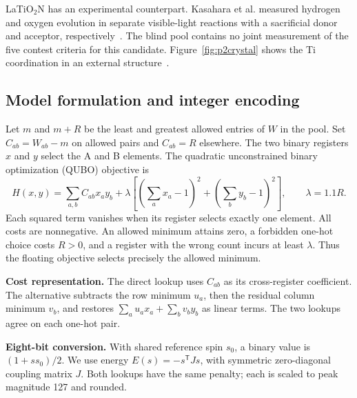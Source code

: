 LaTiO$_2$N has an experimental counterpart. Kasahara et al. measured hydrogen and oxygen evolution in separate visible-light reactions with a sacrificial donor and acceptor, respectively~\cite{kasahara2002}. The blind pool contains no joint measurement of the five contest criteria for this candidate. Figure~\ref{fig:p2crystal} shows the Ti coordination in an external structure~\cite{mp1222738}.
\FloatBarrier

\subsection{Model formulation and integer encoding}\label{sec:p2encoding}
Let $m$ and $m+R$ be the least and greatest allowed entries of $W$ in the pool. Set $C_{ab}=W_{ab}-m$ on allowed pairs and $C_{ab}=R$ elsewhere. The two binary registers $x$ and $y$ select the A and B elements. The quadratic unconstrained binary optimization (QUBO) objective is
\begin{equation}
 H(x,y)=\sum_{a,b} C_{ab}x_a y_b+
 \lambda\left[\left(\sum_a x_a-1\right)^2+
                 \left(\sum_b y_b-1\right)^2\right],\qquad \lambda=1.1R .
 \label{eq:p2qubo}
\end{equation}\nopagebreak[4]
\noindent Each squared term vanishes when its register selects exactly one element. All costs are nonnegative. An allowed minimum attains zero, a forbidden one-hot choice costs $R>0$, and a register with the wrong count incurs at least $\lambda$. Thus the floating objective selects precisely the allowed minimum.

\textbf{Cost representation.} The direct lookup uses $C_{ab}$ as its cross-register coefficient. The alternative subtracts the row minimum $u_a$, then the residual column minimum $v_b$, and restores $\sum_a u_a x_a+\sum_b v_b y_b$ as linear terms. The two lookups agree on each one-hot pair.

\textbf{Eight-bit conversion.} With shared reference spin $s_0$, a binary value is $(1+s s_0)/2$. We use energy $E(s)=-s^{\mathsf T}Js$, with symmetric zero-diagonal coupling matrix $J$. Both lookups have the same penalty; each is scaled to peak magnitude 127 and rounded.

